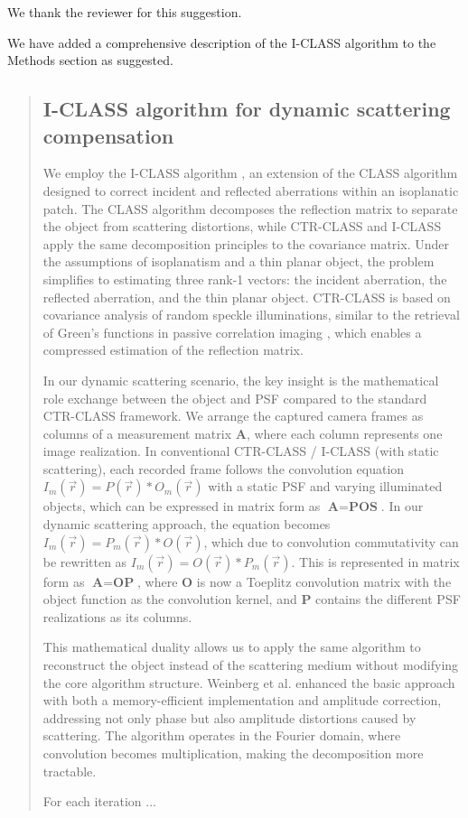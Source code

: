 \documentclass[12pt]{article}
\newenvironment{ourresponse}
    {\begin{tcolorbox}[width=\linewidth,breakable,enhanced,colback=gray!5,colframe=responsecolor!50,title=Response,left=5pt,right=5pt]}
    {\end{tcolorbox}}
\begin{document}
\begin{ourresponse}
We thank the reviewer for this suggestion.

We have added a comprehensive description of the I-CLASS algorithm to the Methods section as suggested.
\begin{quote}
    \subsection*{I-CLASS algorithm for dynamic scattering compensation}
        We employ the I-CLASS algorithm \cite{weinberg2024noninvasive}, an extension of the CLASS algorithm \cite{kang17, kang2024implementation} designed to correct incident and reflected aberrations within an isoplanatic patch. The CLASS algorithm decomposes the reflection matrix to separate the object from scattering distortions, while CTR-CLASS and I-CLASS apply the same decomposition principles to the covariance matrix. Under the assumptions of isoplanatism and a thin planar object, the problem simplifies to estimating three rank-1 vectors: the incident aberration, the reflected aberration, and the thin planar object. CTR-CLASS is based on covariance analysis of random speckle illuminations, similar to the retrieval of Green's functions in passive correlation imaging \cite{wapenaar2004retrieving}, which enables a compressed estimation of the reflection matrix.
        
        In our dynamic scattering scenario, the key insight is the mathematical role exchange between the object and PSF compared to the standard CTR-CLASS framework. We arrange the captured camera frames as columns of a measurement matrix $\textbf{A}$, where each column represents one image realization. In conventional CTR-CLASS / I-CLASS (with static scattering), each recorded frame follows the convolution equation $I_m(\vec{r}) = P(\vec{r}) \ast O_m(\vec{r})$ with a static PSF and varying illuminated objects, which can be expressed in matrix form as $\textbf{A} = \textbf{P}\textbf{O}\textbf{S}$. In our dynamic scattering approach, the equation becomes $I_m(\vec{r}) = P_m(\vec{r}) \ast O(\vec{r})$, which due to convolution commutativity can be rewritten as $I_m(\vec{r}) = O(\vec{r}) \ast P_m(\vec{r})$. This is represented in matrix form as $\textbf{A} = \textbf{O}\textbf{P}$, where $\textbf{O}$ is now a Toeplitz convolution matrix with the object function as the convolution kernel, and $\textbf{P}$ contains the different PSF realizations as its columns.

        This mathematical duality allows us to apply the same algorithm to reconstruct the object instead of the scattering medium without modifying the core algorithm structure. Weinberg et al. \cite{weinberg2024noninvasive} enhanced the basic approach with both a memory-efficient implementation and amplitude correction, addressing not only phase but also amplitude distortions caused by scattering. The algorithm operates in the Fourier domain, where convolution becomes multiplication, making the decomposition more tractable. 
        
        For each iteration ...
\end{quote}

\end{ourresponse}
\end{document}
